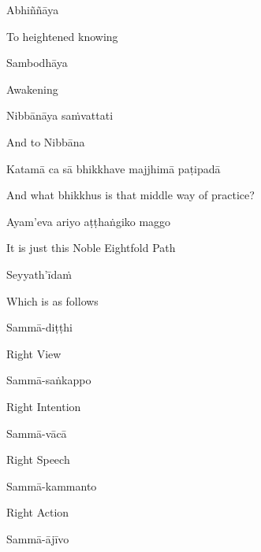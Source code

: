 Abhiññāya

\begin{english}
  To heightened knowing
\end{english}

Sambodhāya

\begin{english}
  Awakening
\end{english}

Nibbānāya saṁvattati

\begin{english}
  And to Nibbāna
\end{english}

Katamā ca sā bhikkhave majjhimā paṭipadā

\begin{english}
  And what bhikkhus is that middle way of practice?
\end{english}

Ayam'eva ariyo aṭṭhaṅgiko maggo

\begin{english}
  It is just this Noble Eightfold Path\makeatletter\hyperlink{endnote51-appendix}\makeatother
\end{english}

Seyyath'īdaṁ

\begin{english}
  Which is as follows
\end{english}

Sammā-diṭṭhi

\begin{english}
  Right View
\end{english}

Sammā-saṅkappo

\begin{english}
  Right Intention
\end{english}

Sammā-vācā

\begin{english}
  Right Speech
\end{english}

Sammā-kammanto

\begin{english}
  Right Action
\end{english}

Sammā-ājīvo

